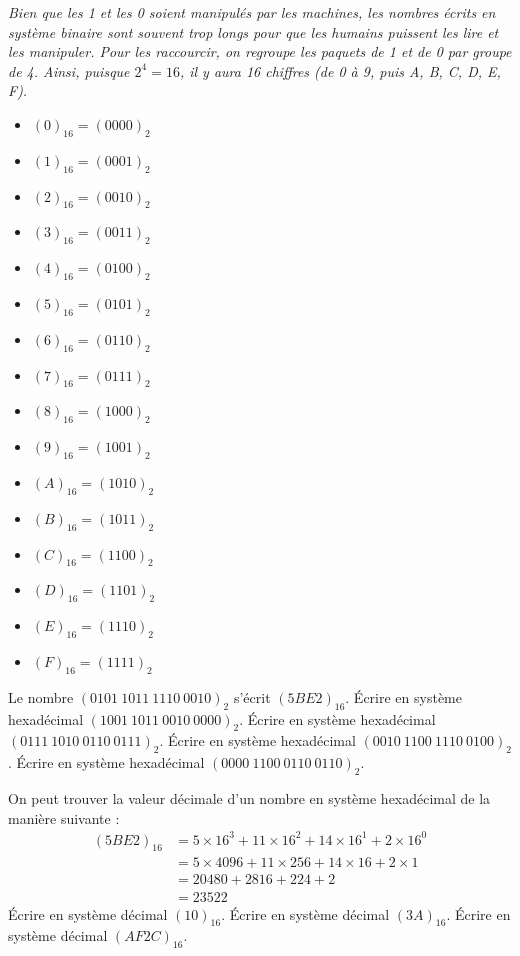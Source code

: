 \documentclass["../Cours.tex"]{subfiles}
\begin{document}
{\begin{questions}
    \clearpage

    \textit{Bien que les 1 et les 0 soient manipulés par les machines, les nombres écrits en système binaire sont souvent trop longs pour que les humains puissent les lire et les manipuler. Pour les raccourcir, on regroupe les paquets de 1 et de 0 par groupe de 4. Ainsi, puisque $2^4=16$, il y aura 16 chiffres (de 0 à 9, puis A, B, C, D, E, F).}

    \begin{multicols}{4}
        \begin{itemize}
            \item \( (0)_{16} = (0000)_2 \)
            \item \( (1)_{16} = (0001)_2 \)
            \item \( (2)_{16} = (0010)_2 \)
            \item \( (3)_{16} = (0011)_2 \)
            \item \( (4)_{16} = (0100)_2 \)
            \item \( (5)_{16} = (0101)_2 \)
            \item \( (6)_{16} = (0110)_2 \)
            \item \( (7)_{16} = (0111)_2 \)
            \item \( (8)_{16} = (1000)_2 \)
            \item \( (9)_{16} = (1001)_2 \)
            \item \( (A)_{16} = (1010)_2 \)
            \item \( (B)_{16} = (1011)_2 \)
            \item \( (C)_{16} = (1100)_2 \)
            \item \( (D)_{16} = (1101)_2 \)
            \item \( (E)_{16} = (1110)_2 \)
            \item \( (F)_{16} = (1111)_2 \)
        \end{itemize}
    \end{multicols}

    \question Le nombre $(0101~1011~1110~0010)_2$ s'écrit $(5BE2)_{16}$.
    \subquestion Écrire en système hexadécimal $(1001~1011~0010~0000)_2$.
    \subquestion Écrire en système hexadécimal $(0111~1010~0110~0111)_2$.
    \subquestion Écrire en système hexadécimal $(0010~1100~1110~0100)_2$.
    \subquestion Écrire en système hexadécimal $(0000~1100~0110~0110)_2$.

    \question On peut trouver la valeur décimale d'un nombre en système hexadécimal de la manière suivante : 
    \begin{align*}
        (5BE2)_{16} &= 5 \times 16^3 + 11 \times 16^2 + 14 \times 16^1 + 2 \times 16^0 \\
        &= 5 \times 4096 + 11 \times 256 + 14 \times 16 + 2 \times 1 \\ 
        &= 20480 + 2816 + 224 + 2 \\ 
        &= 23522
    \end{align*}
    \subquestion Écrire en système décimal $(10)_{16}$.
    \subquestion Écrire en système décimal $(3A)_{16}$.
    \subquestion Écrire en système décimal $(AF2C)_{16}$.


\end{questions}}
\end{document}
